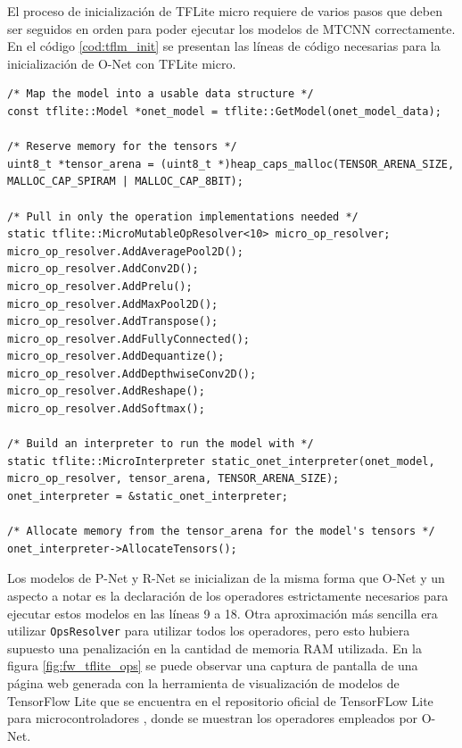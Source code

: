 El proceso de inicialización de TFLite micro requiere de varios pasos que deben ser seguidos en orden para poder ejecutar los modelos de MTCNN correctamente. En el código \ref{cod:tflm_init} se presentan las líneas de código necesarias para la inicialización de O-Net con TFLite micro.

\begin{lstlisting}[label=cod:tflm_init,caption=Código para inicializar O-Net con TFLite micro.]
/* Map the model into a usable data structure */
const tflite::Model *onet_model = tflite::GetModel(onet_model_data);

/* Reserve memory for the tensors */
uint8_t *tensor_arena = (uint8_t *)heap_caps_malloc(TENSOR_ARENA_SIZE, MALLOC_CAP_SPIRAM | MALLOC_CAP_8BIT);

/* Pull in only the operation implementations needed */
static tflite::MicroMutableOpResolver<10> micro_op_resolver;
micro_op_resolver.AddAveragePool2D();
micro_op_resolver.AddConv2D();
micro_op_resolver.AddPrelu();
micro_op_resolver.AddMaxPool2D();
micro_op_resolver.AddTranspose();
micro_op_resolver.AddFullyConnected();
micro_op_resolver.AddDequantize();
micro_op_resolver.AddDepthwiseConv2D();
micro_op_resolver.AddReshape();
micro_op_resolver.AddSoftmax();

/* Build an interpreter to run the model with */
static tflite::MicroInterpreter static_onet_interpreter(onet_model, micro_op_resolver, tensor_arena, TENSOR_ARENA_SIZE);
onet_interpreter = &static_onet_interpreter;

/* Allocate memory from the tensor_arena for the model's tensors */
onet_interpreter->AllocateTensors();
\end{lstlisting}

\newpage

Los modelos de P-Net y R-Net se inicializan de la misma forma que O-Net y un aspecto a notar es la declaración de los operadores estrictamente necesarios para ejecutar estos modelos en las líneas 9 a 18. Otra aproximación más sencilla era utilizar \texttt{OpsResolver} para utilizar todos los operadores, pero esto hubiera supuesto una penalización en la cantidad de memoria RAM utilizada. En la figura \ref{fig:fw_tflite_ops} se puede observar una captura de pantalla de una página web generada con la herramienta de visualización de modelos de TensorFlow Lite que se encuentra en el repositorio oficial de TensorFLow Lite para microcontroladores \cite{tflm_repo}, donde se muestran los operadores empleados por O-Net.

